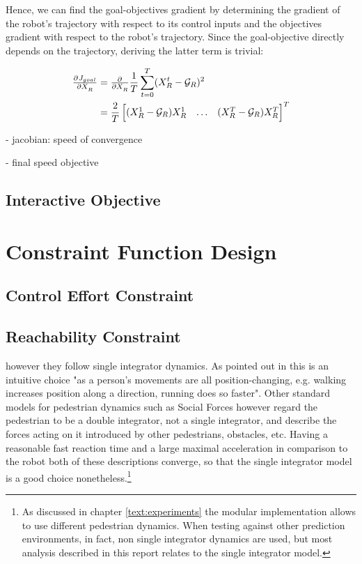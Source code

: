 Hence, we can find the goal-objectives gradient by determining the gradient of the robot's trajectory with respect to its control inputs and the objectives gradient with respect to the robot's trajectory. Since the goal-objective directly depends on the trajectory, deriving the latter term is trivial: 

\begin{align}
\pd{J_{goal}}{X_R} &= \pd{}{X_R} \frac{1}{T} \sum_{t = 0}^T (X_R^t - \mathcal{G}_R)^2 \\
&= \frac{2}{T} \begin{bmatrix} (X_R^1 - \mathcal{G}_R) X_R^1 & \hdots & (X_R^T - \mathcal{G}_R) X_R^T \end{bmatrix}^T
\end{align}


- jacobian: speed of convergence

- final speed objective

\subsection{Interactive Objective}
\label{text:approach/objective/interactive}

\section{Constraint Function Design}
\label{text:approach/constraint}

\subsection{Control Effort Constraint}
\label{text:approach/constraint/dynamics}

\subsection{Reachability Constraint}
\label{text:approach/constraint/reachability}

however they follow single integrator dynamics. As pointed out in \cite{Ivanovic18} this is an intuitive choice "as a person’s movements are all position-changing, e.g. walking increases position along a direction, running does so faster". Other standard models for pedestrian dynamics such as Social Forces \cite{Helbling1995} however regard the pedestrian to be a double integrator, not a single integrator, and describe the forces acting on it introduced by other pedestrians, obstacles, etc. Having a reasonable fast reaction time and a large maximal acceleration in comparison to the robot both of these descriptions converge, so that the single integrator model is a good choice nonetheless.\footnote{As discussed in chapter \ref{text:experiments} the modular implementation allows to use different pedestrian dynamics. When testing against other prediction environments, in fact, non single integrator dynamics are used, but most analysis described in this report relates to the single integrator model.} 

